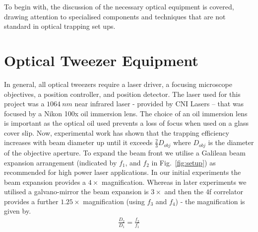 To begin with, the discussion of the necessary optical equipment is 
covered, drawing attention to specialised components and techniques 
that are not standard in optical trapping set ups.
\section{Optical Tweezer Equipment}
In general, all optical tweezers require a laser driver, a focusing 
microscope objectives, a position controller, and position detector.
The laser used for this project was a $1064\ nm$ near infrared laser 
- provided by CNI Lasers – that was focused by a Nikon 100x oil 
immersion lens. The choice of an oil immersion lens is important as 
the optical oil used prevents a loss of focus when used on a glass 
cover slip. Now, experimental work has shown that the trapping 
efficiency increases with beam diameter up until it exceeds 
$\frac{2}{3}D_{obj}$ \cite{kim2003dependence} where $D_{obj}$ is 
the diameter of the objective aperture. To expand the beam front we 
utilise a Galilean beam expansion arrangement (indicated by $f_1$, 
and $f_2$ in Fig.~\ref{fig:setup}) as recommended for high power laser 
applications. In our initial experiments the beam expansion provides a 
$4\times$ magnification. Whereas in later experiments we utilised a 
galvano-mirror the beam expansion is $3\times$ and then the 4f 
correlator provides a further $1.25\times$ magnification (using $f_3$ 
and $f_4$) - the magnification is given by.
\begin{align}
	\frac{D_2}{D_1} = \frac{f_2}{f_1}
\end{align}

